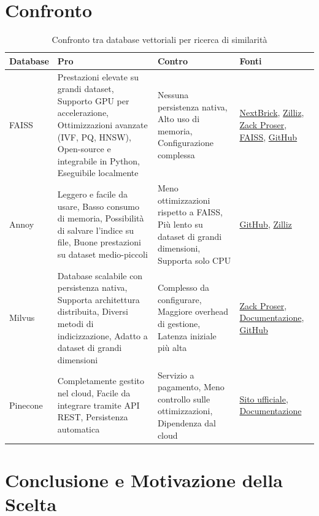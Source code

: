 \documentclass{article}
\begin{document}
\section{Confronto}
\begin{table}[H]
    \centering
    \renewcommand{\arraystretch}{1.3}
    \begin{tabular}{|p{2cm}|p{5cm}|p{5cm}|p{2.5cm}|}
        \hline
        \textbf{Database} & \textbf{Pro} & \textbf{Contro} & \textbf{Fonti} \\
        \hline
        FAISS  & Prestazioni elevate su grandi dataset, Supporto GPU per accelerazione, Ottimizzazioni avanzate (IVF, PQ, HNSW), Open-source e integrabile in Python, Eseguibile localmente & Nessuna persistenza nativa, Alto uso di memoria, Configurazione complessa & \href{https://nextbrick.com/exploring-open-source-vector-search-engines-faiss-vs-milvus-vs-pinecone-2/}{NextBrick}, \href{https://zilliz.com/blog/annoy-vs-faiss-choosing-the-right-tool-for-vector-search}{Zilliz}, \href{https://zackproser.com/blog/vector-databases-compared}{Zack Proser}, \href{https://faiss.ai/}{FAISS}, \href{https://github.com/facebookresearch/faiss}{GitHub} \\
        \hline
        Annoy  & Leggero e facile da usare, Basso consumo di memoria, Possibilità di salvare l’indice su file, Buone prestazioni su dataset medio-piccoli & Meno ottimizzazioni rispetto a FAISS, Più lento su dataset di grandi dimensioni, Supporta solo CPU & \href{https://github.com/spotify/annoy}{GitHub}, \href{https://zilliz.com/blog/annoy-vs-faiss-choosing-the-right-tool-for-vector-search}{Zilliz} \\
        \hline
        Milvus & Database scalabile con persistenza nativa, Supporta architettura distribuita, Diversi metodi di indicizzazione, Adatto a dataset di grandi dimensioni & Complesso da configurare, Maggiore overhead di gestione, Latenza iniziale più alta & \href{https://zackproser.com/blog/vector-databases-compared}{Zack Proser}, \href{https://milvus.io/docs/}{Documentazione}, \href{https://github.com/milvus-io/milvus}{GitHub} \\
        \hline
        Pinecone & Completamente gestito nel cloud, Facile da integrare tramite API REST, Persistenza automatica & Servizio a pagamento, Meno controllo sulle ottimizzazioni, Dipendenza dal cloud & \href{https://www.pinecone.io/}{Sito ufficiale}, \href{https://docs.pinecone.io/}{Documentazione} \\
        \hline
    \end{tabular}
    \caption{Confronto tra database vettoriali per ricerca di similarità}
    \label{tab:vector_db_comparison}
\end{table}

\section{Conclusione e Motivazione della Scelta}
\end{document}
